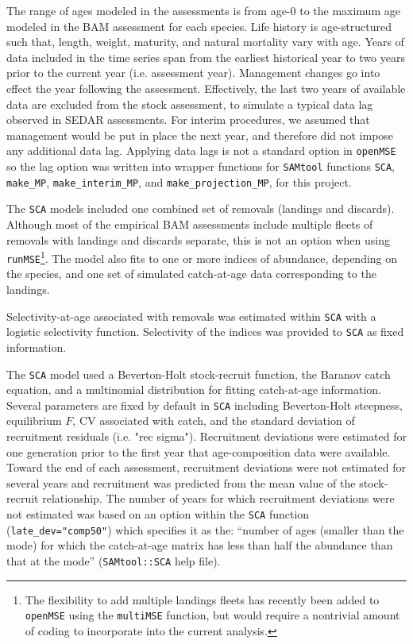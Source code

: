 \documentclass[12pt,english]{article}
\begin{document}
\begin{flushleft}
\begin{spacing}{1.9}
The range of ages modeled in the assessments is from age-0 to the maximum age modeled in the BAM assessment for each species. Life history is age-structured such that, length, weight, maturity, and natural mortality vary with age. Years of data included in the time series span from the earliest historical year to two years prior to the current year (i.e. assessment year).  Management changes go into effect the year following the assessment. Effectively, the last two years of available data are excluded from the stock assessment, to simulate a typical data lag observed in SEDAR assessments. For interim procedures, we assumed that management would be put in place the next year, and therefore did not impose any additional data lag. Applying data lags is not a standard option in \texttt{openMSE} so the lag option was written into wrapper functions for \texttt{SAMtool} functions \texttt{SCA}, \texttt{make\_MP}, \texttt{make\_interim\_MP}, and \texttt{make\_projection\_MP}, for this project.

The \texttt{SCA} models included one combined set of removals (landings and discards). Although most of the empirical BAM assessments include multiple fleets of removals with landings and discards separate, this is not an option when using \texttt{runMSE}\footnote{The flexibility to add multiple landings fleets has recently been added to \texttt{openMSE} using the \texttt{multiMSE} function, but would require a nontrivial amount of coding to incorporate into the current analysis.}. The model also fits to one or more indices of abundance, depending on the species, and one set of simulated catch-at-age data corresponding to the landings.


Selectivity-at-age associated with removals was estimated within \texttt{SCA} with a logistic selectivity function. Selectivity of the indices was provided to \texttt{SCA} as fixed information.

The \texttt{SCA} model used a Beverton-Holt stock-recruit function, the Baranov catch equation, and a multinomial distribution for fitting catch-at-age information. Several parameters are fixed by default in \texttt{SCA} including Beverton-Holt steepness, equilibrium $F$, CV associated with catch, and the standard deviation of recruitment residuals (i.e. "rec sigma"). Recruitment deviations were estimated for one generation prior to the first year that age-composition data were available. Toward the end of each assessment, recruitment deviations were not estimated for several years and recruitment was predicted from the mean value of the stock-recruit relationship. The number of years for which recruitment deviations were not estimated was based on an option within the \texttt{SCA} function (\texttt{late\_dev="comp50"}) which specifies it as the: ``number of ages (smaller than the mode) for which the catch-at-age matrix has less than half the abundance than that at the mode'' (\texttt{SAMtool::SCA} help file).


\end{spacing}
\end{flushleft}
\end{document}
